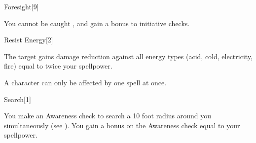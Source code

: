\begin{spellfooter}
\begin{spellsection}[Greater]{Foresight}[9]
    \begin{spellheader}
    \end{spellheader}
    \begin{spellcontent}
        \begin{spelleffects}
            \spelleffect You cannot be caught \unaware, and gain a  bonus to initiative checks.
            \spelldur \durlong
        \end{spelleffects}
    \end{spellcontent}
    \begin{spellfooter}
        \miscastexplode
    \end{spellfooter}
\end{spellsection}


\begin{spellsection}[Greater]{Resist Energy}[2]
    \begin{spellheader}
    \end{spellheader}
    \begin{spellcontent}
        \begin{spelltargetinginfo}
        \end{spelltargetinginfo}
        \begin{spelleffects}
            \spelleffect The target gains damage reduction against all energy types (acid, cold, electricity, fire) equal to twice your spellpower.
            \spelldur \durpersonallong
        \end{spelleffects}
    \end{spellcontent}
    \begin{spellfooter}
        \spellnotes A character can only be affected by one  spell at once.
        \miscastexplode
    \end{spellfooter}
\end{spellsection}

\begin{spellsection}{Search}[1]
    \begin{spellheader}
    \end{spellheader}
    \begin{spellcontent}
        \begin{spelleffects}
            \spelleffect You make an Awareness check to search a 10 foot radius around you simultaneously (see ).
            You gain a bonus on the Awareness check equal to your spellpower.
        \end{spelleffects}
    \end{spellcontent}
    \begin{spellfooter}
    \end{spellfooter}
\end{spellsection}


\end{spellfooter}
